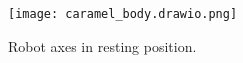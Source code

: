 \documentclass[conference]{IEEEtran}
\begin{document}


\begin{figure}[htbp]
  \centering
  \vspace{-0.75cm}
  \texttt{[image: caramel\_body.drawio.png]}
  
  \caption{Robot axes in resting position.}
  \label{fig:caramel_body}
\end{figure}
\end{document}
